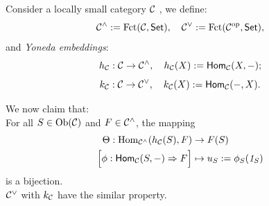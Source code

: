 \documentclass{article}
\begin{document}
\begin{thm}
	Consider a locally small category $\mathcal{C}$ , we define:
		$$\mathcal{C}^\wedge:=\mathrm{Fct}(\mathcal{C},\mathsf{Set}),\quad\mathcal{C}^\vee:=\mathrm{Fct}(\mathcal{C}^\mathrm{op},\mathsf{Set}),$$
	and \emph{Yoneda embeddings}:
		$$h_{\mathcal{C}}:\mathcal{C}\to\mathcal{C}^\wedge,\quad h_{\mathcal{C}}(X):=\mathsf{Hom}_{\mathcal{C}}(X,-);$$
		$$k_{\mathcal{C}}:\mathcal{C}\to\mathcal{C}^\vee  ,\quad k_{\mathcal{C}}(X):=\mathsf{Hom}_{\mathcal{C}}(-,X).$$
	
	We now claim that:\\
	For all $S\in\mathrm{Ob}(\mathcal{C})$ and $F\in\mathcal{C}^\wedge$, the mapping
	\begin{align*}
		\Theta:\mathrm{Hom}_{\mathcal{C}^\wedge}(h_{\mathcal{C}}(S),F) & \to F(S)\\
		\Big[\phi:\mathsf{Hom}_{\mathcal{C}}(S,-)\Rightarrow F\Big] & \mapsto u_S:=\phi_S(\mathit{1}_S)
	\end{align*}
	is a bijection.\\
	$\mathcal{C}^\vee$ with $k_{\mathcal{C}}$ have the similar property.
\end{thm}
\end{document}
